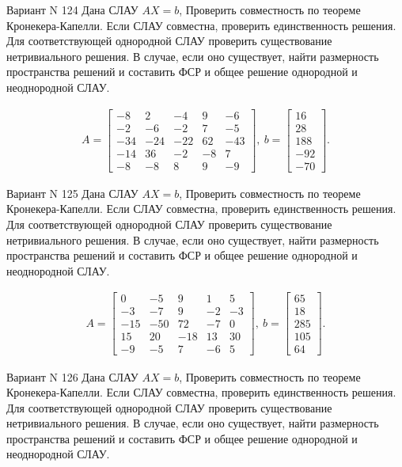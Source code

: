 \documentclass[11pt]{report}
\begin{document}
Вариант N 124
Дана СЛАУ $AX = b$,
Проверить совместность по теореме Кронекера-Капелли. Если СЛАУ совместна, проверить единственность решения.
Для соответствующей однородной СЛАУ проверить существование нетривиального решения. В случае, если оно существует,
найти размерность пространства решений и составить ФСР и общее решение однородной  и неоднородной СЛАУ.


\begin{align*}
 A = \left[\begin{matrix}-8 & 2 & -4 & 9 & -6\\-2 & -6 & -2 & 7 & -5\\-34 & -24 & -22 & 62 & -43\\-14 & 36 & -2 & -8 & 7\\-8 & -8 & 8 & 9 & -9\end{matrix}\right],
\ b = \left[\begin{matrix}16\\28\\188\\-92\\-70\end{matrix}\right]. 
 \end{align*}

Вариант N 125
Дана СЛАУ $AX = b$,
Проверить совместность по теореме Кронекера-Капелли. Если СЛАУ совместна, проверить единственность решения.
Для соответствующей однородной СЛАУ проверить существование нетривиального решения. В случае, если оно существует,
найти размерность пространства решений и составить ФСР и общее решение однородной  и неоднородной СЛАУ.


\begin{align*}
 A = \left[\begin{matrix}0 & -5 & 9 & 1 & 5\\-3 & -7 & 9 & -2 & -3\\-15 & -50 & 72 & -7 & 0\\15 & 20 & -18 & 13 & 30\\-9 & -5 & 7 & -6 & 5\end{matrix}\right],
\ b = \left[\begin{matrix}65\\18\\285\\105\\64\end{matrix}\right]. 
 \end{align*}

Вариант N 126
Дана СЛАУ $AX = b$,
Проверить совместность по теореме Кронекера-Капелли. Если СЛАУ совместна, проверить единственность решения.
Для соответствующей однородной СЛАУ проверить существование нетривиального решения. В случае, если оно существует,
найти размерность пространства решений и составить ФСР и общее решение однородной  и неоднородной СЛАУ.
\end{document}
